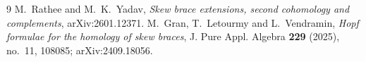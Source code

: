 \documentclass[11pt]{article}
\theoremstyle{definition}
\begin{document}
\begin{thebibliography}{9}
M.~Rathee and M.~K.~Yadav,
\emph{Skew brace extensions, second cohomology and complements},
arXiv:2601.12371.
M.~Gran, T.~Letourmy and L.~Vendramin,
\emph{Hopf formulae for the homology of skew braces},
J. Pure Appl. Algebra \textbf{229} (2025), no.~11, 108085; arXiv:2409.18056.
\end{thebibliography}
\end{document}
